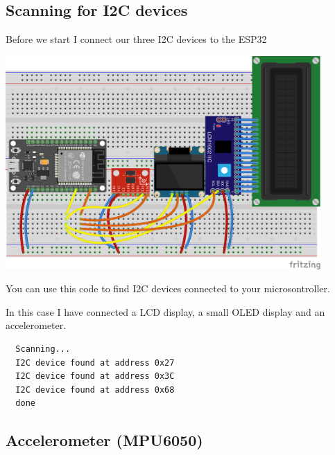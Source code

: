 \documentclass[12pt, a4paper]{article}
\begin{document}
\subsection{Scanning for I2C devices}

Before we start I connect our three I2C devices to the ESP32 

\begin{center}
  \includegraphics[width=12cm, keepaspectratio]{fritzing/i2c_devices.png}
\end{center}

You can use this code to find I2C devices connected to your microsontroller.



In this case I have connected a LCD display, a small OLED display and an accelerometer.

\begin{lstlisting}
  Scanning...
  I2C device found at address 0x27
  I2C device found at address 0x3C
  I2C device found at address 0x68
  done
\end{lstlisting}

\subsection{Accelerometer (MPU6050)}


\end{document}
